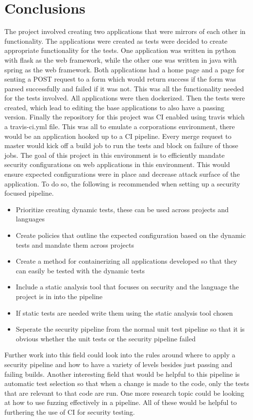 \section{Conclusions}
The project involved creating two applications that were mirrors of each other in functionality. The applications were created as tests were decided to create appropriate functionality for the tests.
One application was written in python with flask as the web framework, while the other one was written in java with spring as the web framework. Both applications had a home page and a page for
senting a POST request to a form which would return success if the form was parsed successfully and failed if it was not. This was all the functionality needed for the tests involved.
All applications were then dockerized. Then the tests were created, which lead to editing the base applications to also have a passing version. Finally the repository for this project was CI enabled
using travis which a travis-ci.yml file.
This was all to emulate a corporations environment, there would be an application hooked up to a CI pipeline. Every merge request to master would kick off a build job to run the tests and block on
failure of those jobs. The goal of this project in this environment is to efficiently mandate security configurations on web applications in this environment. This would ensure expected configurations
were in place and decrease attack surface of the application. To do so, the following is recommended when setting up a security focused pipeline.
\begin{itemize}
    \item Prioritize creating dynamic tests, these can be used across projects and languages
    \item Create policies that outline the expected configuration based on the dynamic tests and mandate them across projects
    \item Create a method for containerizing all applications developed so that they can easily be tested with the dynamic tests
    \item Include a static analysis tool that focuses on security and the language the project is in into the pipeline
    \item If static tests are needed write them using the static analysis tool chosen
    \item Seperate the security pipeline from the normal unit test pipeline so that it is obvious whether the unit tests or the security pipeline failed 
\end{itemize}
Further work into this field could look into the rules around where to apply a security pipeline and how to have a variety of levels besides just passing and failing builds. Another interesting field that
would be helpful to this pipeline is automatic test selection so that when a change is made to the code, only the tests that are relevant to that code are run. One more research topic could be looking
at how to use fuzzing effectively in a pipeline. All of these would be helpful to furthering the use of CI for security testing.
